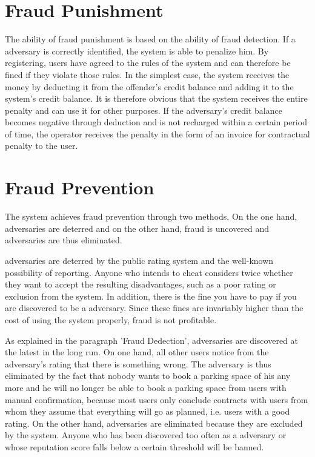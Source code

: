 \section{Fraud Punishment}
The ability of fraud punishment is based on the ability of fraud detection. If a adversary is correctly identified, the system is able to penalize him. By registering, users have agreed to the rules of the system and can therefore be fined if they violate those rules. In the simplest case, the system receives the money by deducting it from the offender's credit balance and adding it to the system's credit balance. It is therefore obvious that the system receives the entire penalty and can use it for other purposes. If the adversary's credit balance becomes negative through deduction and is not recharged within a certain period of time, the operator receives the penalty in the form of an invoice for contractual penalty to the user.

\section{Fraud Prevention}
The system achieves fraud prevention through two methods. On the one hand, adversaries are deterred and on the other hand, fraud is uncovered and adversaries are thus eliminated.

adversaries are deterred by the public rating system and the well-known possibility of reporting. Anyone who intends to cheat considers twice whether they want to accept the resulting disadvantages, such as a poor rating or exclusion from the system. In addition, there is the fine you have to pay if you are discovered to be a adversary. Since these fines are invariably higher than the cost of using the system properly, fraud is not profitable.

As explained in the paragraph 'Fraud Dedection', adversaries are discovered at the latest in the long run. On one hand, all other users notice from the adversary's rating that there is something wrong. The adversary is thus eliminated by the fact that nobody wants to book a parking space of his any more and he will no longer be able to book a parking space from users with manual confirmation, because most users only conclude contracts with users from whom they assume that everything will go as planned, i.e. users with a good rating. On the other hand, adversaries are eliminated because they are excluded by the system. Anyone who has been discovered too often as a adversary or whose reputation score falls below a certain threshold will be banned.

